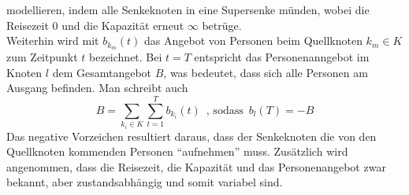\documentclass[a4paper, 11pt]{scrreprt}
\begin{document}
modellieren, indem alle Senkeknoten in eine Supersenke münden, wobei die Reisezeit $0$ und die Kapazität erneut
$\infty$ betrüge.\\
Weiterhin wird mit
$b_{k_m}(t)$ das Angebot von Personen beim Quellknoten $k_m \in K$ zum
Zeitpunkt $t$ bezeichnet.
Bei $t = T$ entspricht das Personenanngebot im Knoten $l$ dem Gesamtangebot $B$, was bedeutet, dass sich alle Personen
am Ausgang befinden. Man schreibt auch
\begin{equation}
  B = \sum_{k_i \in K}\sum_{t=1}^{T}b_{k_i}(t)\,\,\,\text{, sodass}\,\,\, b_l(T)=-B
\end{equation}
Das negative Vorzeichen resultiert daraus, dass der Senkeknoten die von den Quellknoten kommenden Personen
``aufnehmen'' muss.
Zusätzlich wird angenommen, dass die Reisezeit, die Kapazität und das Personenangebot zwar bekannt, aber
zustandsabhängig und somit variabel sind.
\end{document}
